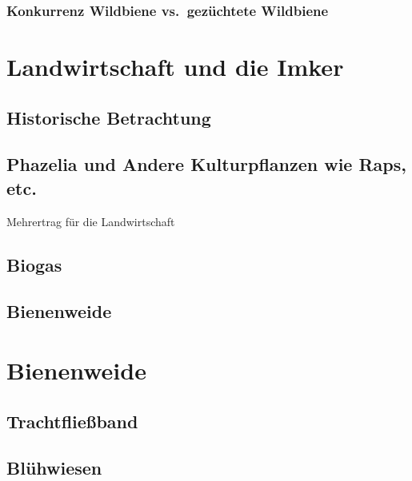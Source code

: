 \documentclass[
]{book}
\begin{document}
\hypertarget{konkurrenz-wildbiene-vs.-gezuxfcchtete-wildbiene}{%
\subsection{Konkurrenz Wildbiene vs.~gezüchtete Wildbiene}\label{konkurrenz-wildbiene-vs.-gezuxfcchtete-wildbiene}}

\hypertarget{landwirtschaft-und-die-imker}{%
\chapter{Landwirtschaft und die Imker}\label{landwirtschaft-und-die-imker}}

\hypertarget{historische-betrachtung}{%
\section{Historische Betrachtung}\label{historische-betrachtung}}

\hypertarget{phazelia-und-andere-kulturpflanzen-wie-raps-etc.}{%
\section{Phazelia und Andere Kulturpflanzen wie Raps, etc.}\label{phazelia-und-andere-kulturpflanzen-wie-raps-etc.}}

Mehrertrag für die Landwirtschaft

\hypertarget{biogas}{%
\section{Biogas}\label{biogas}}

\hypertarget{bienenweide}{%
\section{Bienenweide}\label{bienenweide}}

\hypertarget{bienenweide-1}{%
\chapter{Bienenweide}\label{bienenweide-1}}

\hypertarget{trachtflieuxdfband}{%
\section{Trachtfließband}\label{trachtflieuxdfband}}

\hypertarget{bluxfchwiesen}{%
\section{Blühwiesen}\label{bluxfchwiesen}}
\end{document}

